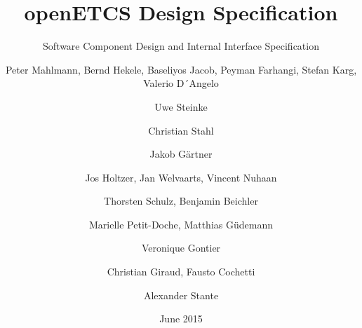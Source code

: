 \documentclass{template/openetcs_report}
\begin{document}
\frontmatter
{}

\newcommand{\define}[1]{\index{#1}\emph{#1}}







\title{openETCS Design Specification}

\subtitle{Software Component Design and Internal Interface Specification}

\date{June 2015}








\author{Peter Mahlmann, Bernd Hekele, Baseliyos Jacob, Peyman Farhangi, Stefan Karg, Valerio D´Angelo}

\author{Uwe Steinke}

\author{Christian Stahl}

\author{Jakob G\"artner}

\author{Jos Holtzer, Jan Welvaarts, Vincent Nuhaan}

\author{Thorsten Schulz, Benjamin Beichler}

\author{Marielle Petit-Doche, Matthias G\"udemann}

\author{Veronique Gontier}

\author{Christian Giraud, Fausto Cochetti}

\author{Alexander Stante}
\end{document}
